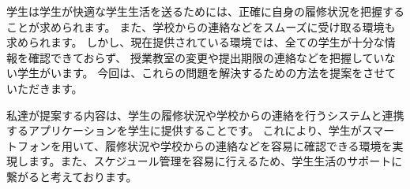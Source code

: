 学生は学生が快適な学生生活を送るためには、正確に自身の履修状況を把握することが求められます。
また、学校からの連絡などをスムーズに受け取る環境も求められます。
しかし、現在提供されている環境では、全ての学生が十分な情報を確認できておらず、
授業教室の変更や提出期限の連絡などを把握していない学生がいます。
今回は、これらの問題を解決するための方法を提案をさせていただきます。

私達が提案する内容は、学生の履修状況や学校からの連絡を行うシステムと連携するアプリケーションを学生に提供することです。
これにより、学生がスマートフォンを用いて、履修状況や学校からの連絡などを容易に確認できる環境を実現します。また、スケジュール管理を容易に行えるため、学生生活のサポートに繋がると考えております。
